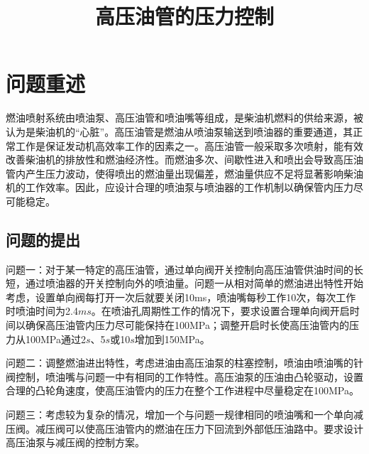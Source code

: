 \documentclass[withoutpreface,bwprint]{cumcmthesis} %
\title{ }
\begin{document}
	\title{高压油管的压力控制}
	
	\maketitle
	
	\begin{abstract}
		
		
		
		
	\end{abstract}
	
	
	
	
	
	\section{问题重述}
	燃油喷射系统由喷油泵、高压油管和喷油嘴等组成，是柴油机燃料的供给来源，被认为是柴油机的“心脏”。高压油管是燃油从喷油泵输送到喷油器的重要通道，其正常工作是保证发动机高效率工作的因素之一。高压油管一般采取多次喷射，能有效改善柴油机的排放性和燃油经济性。而燃油多次、间歇性进入和喷出会导致高压油管内产生压力波动，使得喷出的燃油量出现偏差，燃油量供应不足将显著影响柴油机的工作效率。因此，应设计合理的喷油泵与喷油器的工作机制以确保管内压力尽可能稳定。
	
	
	
	\subsection{问题的提出}
	问题一：对于某一特定的高压油管，通过单向阀开关控制向高压油管供油时间的长短，通过喷油器的开关控制向外的喷油量。问题一从相对简单的燃油进出特性开始考虑，设置单向阀每打开一次后就要关闭10ms，喷油嘴每秒工作10次，每次工作时喷油时间为2.4$ms$。在喷油孔周期性工作的情况下，要求设置合理单向阀开启时间以确保高压油管内压力尽可能保持在100MPa；调整开启时长使高压油管内的压力从100MPa通过2$s$、5$s$或10$s$增加到150MPa。
	
	
	问题二：调整燃油进出特性，考虑进油由高压油泵的柱塞控制，喷油由喷油嘴的针阀控制，喷油嘴与问题一中有相同的工作特性。高压油泵的压油由凸轮驱动，设置合理的凸轮角速度，使高压油管内的压力在整个工作进程中尽量稳定在100MPa。
	
	
	问题三：考虑较为复杂的情况，增加一个与问题一规律相同的喷油嘴和一个单向减压阀。减压阀可以使高压油管内的燃油在压力下回流到外部低压油路中。要求设计高压油泵与减压阀的控制方案。
	
\end{document}
